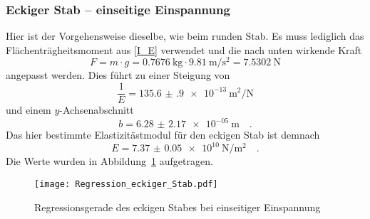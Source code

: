\subsubsection{Eckiger Stab -- einseitige Einspannung}
Hier ist der Vorgehensweise dieselbe, wie beim runden Stab. Es muss lediglich das Flächenträgheitsmoment aus \eqref{I_E} verwendet und die nach unten wirkende Kraft
\begin{equation}
  F = m \cdot g = \SI{0.7676}{\kilo\gram} \cdot \SI{9.81}{\metre\per\second\squared} = \SI{7.5302}{\newton}
\end{equation}
angepasst werden.
Dies führt zu einer Steigung von
\begin{equation}
  \frac{1}{E}= \SI{135.6(9)e-13}{\metre\squared\per\newton}
\end{equation}
und einem $y$-Achsenabschnitt
\begin{equation}
  b = \SI{6.28(217)e-05}{\metre} \quad.
\end{equation}
Das hier bestimmte Elastizitästmodul für den eckigen Stab ist demnach
\begin{equation}
  E = \SI{7.37(5)e+10}{\newton\per\metre\squared} \quad.
\end{equation}
Die Werte wurden in Abbildung~\ref{fig:Regression_eckiger_Stab} aufgetragen.

\begin{figure}[h!]
\centering
\texttt{[image: Regression\_eckiger\_Stab.pdf]}
\caption{Regressionsgerade des eckigen Stabes bei einseitiger Einspannung}
\label{fig:Regression_eckiger_Stab}
\end{figure}







